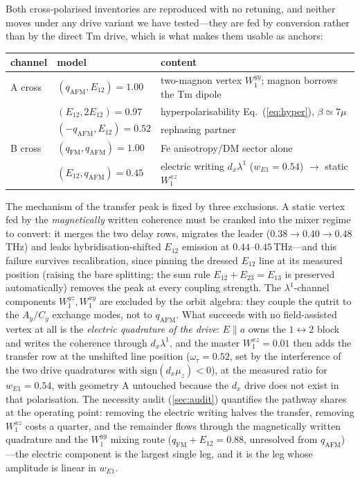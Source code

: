 \documentclass[11pt,a4paper]{article}
\newcommand{\qafm}{q_{\mathrm{AFM}}}
\newcommand{\qfm}{q_{\mathrm{FM}}}
\begin{document}
Both cross-polarised inventories are reproduced with no retuning, and
neither moves under any drive variant we have tested---they are fed by
conversion rather than by the direct Tm drive, which is what makes them
usable as anchors:
\begin{center}\small
\renewcommand{\arraystretch}{1.2}
\begin{tabular}{lll}
\toprule
channel & model & content\\
\midrule
A cross & $(\qafm,E_{12})=1.00$ & two-magnon vertex $W^{yy}_1$;
  magnon borrows the Tm dipole\\
 & $(E_{12},2E_{12})=0.97$ & hyperpolarisability
  Eq.~(\ref{eq:hyper}), $\beta\simeq7\mu$\\
 & $(-\qafm,E_{12})=0.52$ & rephasing partner\\
B cross & $(\qfm,\qafm)=1.00$ & Fe anisotropy/DM sector alone\\
 & $(E_{12},\qafm)=0.45$ & electric writing $d_x\lambda^1$
   ($w_{E1}=0.54$) $\to$ static $W^{xz}_1$\\
\bottomrule
\end{tabular}
\end{center}
The mechanism of the transfer peak is fixed by three exclusions.  A
static vertex fed by the \emph{magnetically} written coherence must be
cranked into the mixer regime to convert: it merges the two delay rows,
migrates the leader ($0.38\to0.40\to0.48$\,THz) and leaks
hybridisation-shifted $E_{12}$ emission at $0.44$--$0.45$\,THz---and this
failure survives recalibration, since pinning the dressed $E_{12}$ line
at its measured position (raising the bare splitting; the sum rule
$E_{12}{+}E_{23}{=}E_{13}$ is preserved automatically) removes the peak
at every coupling strength.  The $\lambda^1$-channel components
$W^{yz}_1,W^{xy}_1$ are excluded by the orbit algebra: they couple the
qutrit to the $A_y/C_y$ exchange modes, not to $\qafm$.  What succeeds
with no field-assisted vertex at all is the \emph{electric quadrature of
the drive}: $E\!\parallel\!a$ owns the $1\!\leftrightarrow\!2$ block and
writes the coherence through $d_x\lambda^1$, and the master
$W^{xz}_1=0.01$ then adds the transfer row at the unshifted line
position ($\omega_\tau=0.52$, set by the interference of the two drive
quadratures with $\mathrm{sign}(d_x\mu_z)<0$), at the measured ratio for
$w_{E1}=0.54$, with geometry A untouched because the $d_x$ drive does
not exist in that polarisation.  The necessity audit
(\cref{sec:audit}) quantifies the pathway shares at the operating
point: removing the electric writing halves the transfer, removing
$W^{xz}_1$ costs a quarter, and the remainder flows through the
magnetically written quadrature and the $W^{yy}_1$ mixing route
($\qfm{+}E_{12}=0.88$, unresolved from $\qafm$)---the electric
component is the largest single leg, and it is the leg whose
amplitude is linear in $w_{E1}$.
\end{document}
